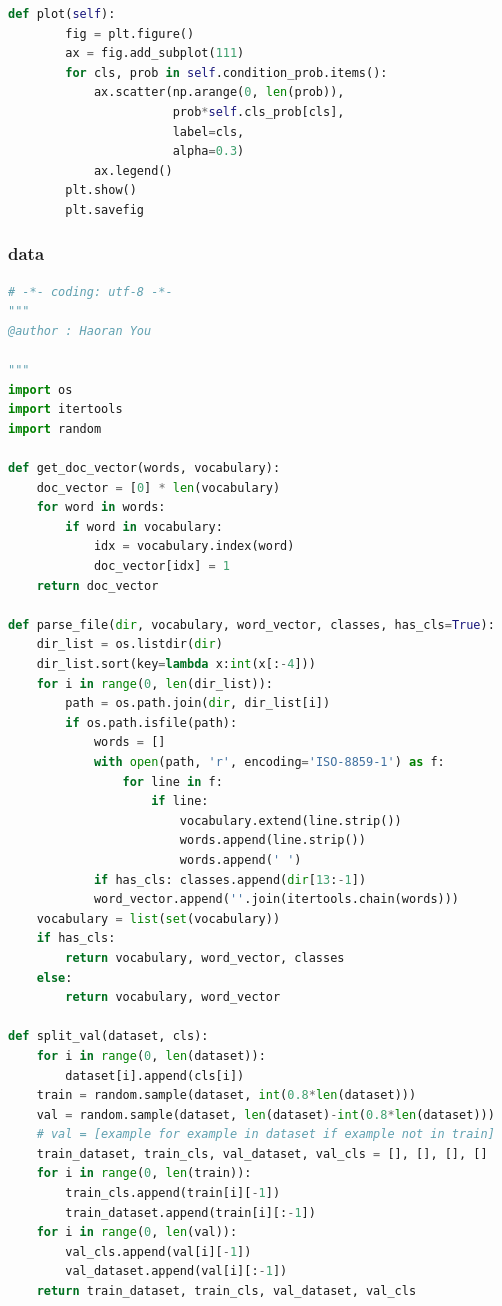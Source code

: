 \documentclass[UTF-8, a4paper, 11pt]{article}
\numberwithin{equation}{section}
\begin{document}
\begin{lstlisting}[language=python]
    def plot(self):
        fig = plt.figure()
        ax = fig.add_subplot(111)
        for cls, prob in self.condition_prob.items():
            ax.scatter(np.arange(0, len(prob)),
                       prob*self.cls_prob[cls],
                       label=cls,
                       alpha=0.3)
            ax.legend()
        plt.show()
        plt.savefig
\end{lstlisting}
\subsubsection{data}
\begin{lstlisting}[language=python]
# -*- coding: utf-8 -*-
"""
@author : Haoran You

"""
import os
import itertools
import random

def get_doc_vector(words, vocabulary):
    doc_vector = [0] * len(vocabulary)
    for word in words:
        if word in vocabulary:
            idx = vocabulary.index(word)
            doc_vector[idx] = 1
    return doc_vector

def parse_file(dir, vocabulary, word_vector, classes, has_cls=True):
    dir_list = os.listdir(dir)
    dir_list.sort(key=lambda x:int(x[:-4]))
    for i in range(0, len(dir_list)):
        path = os.path.join(dir, dir_list[i])
        if os.path.isfile(path):
            words = []
            with open(path, 'r', encoding='ISO-8859-1') as f:
                for line in f:
                    if line:
                        vocabulary.extend(line.strip())
                        words.append(line.strip())
                        words.append(' ')
            if has_cls: classes.append(dir[13:-1])
            word_vector.append(''.join(itertools.chain(words)))
    vocabulary = list(set(vocabulary))
    if has_cls:
        return vocabulary, word_vector, classes
    else:
        return vocabulary, word_vector

def split_val(dataset, cls):
    for i in range(0, len(dataset)):
        dataset[i].append(cls[i])
    train = random.sample(dataset, int(0.8*len(dataset)))
    val = random.sample(dataset, len(dataset)-int(0.8*len(dataset)))
    # val = [example for example in dataset if example not in train]
    train_dataset, train_cls, val_dataset, val_cls = [], [], [], []
    for i in range(0, len(train)):
        train_cls.append(train[i][-1])
        train_dataset.append(train[i][:-1])
    for i in range(0, len(val)):
        val_cls.append(val[i][-1])
        val_dataset.append(val[i][:-1])
    return train_dataset, train_cls, val_dataset, val_cls


\end{lstlisting}
\end{document}
